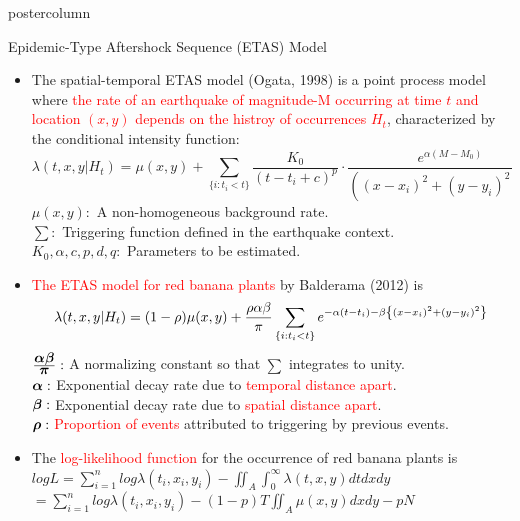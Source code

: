 \documentclass[final]{beamer}\usepackage[]{graphicx}\usepackage[]{color}
\newcommand{\bpi}{\mbox{\boldmath $\pi$} }
\newcommand{\balpha}{\mbox{\boldmath $\alpha$} }
\newcommand{\bbeta}{\mbox{\boldmath $\beta$} }
\newcommand{\brho}{\mbox{\boldmath $\rho$} }
\let\originalleft\left
\let\originalright\right
\renewcommand{\left}{\mathopen{}\mathclose\bgroup\originalleft}
\renewcommand{\right}{\aftergroup\egroup\originalright}
\newcommand{\red}{\textcolor{red}}
\begin{document}
{\begin{frame}
\begin{columns}
\begin{column}{.33\textwidth}
\begin{beamercolorbox}[center,wd=\textwidth]{postercolumn}
\begin{minipage}[T]{.97\textwidth}
{\begin{block}{Epidemic-Type Aftershock Sequence (ETAS) Model}
\begin{itemize}
	\item The spatial-temporal ETAS model (Ogata, 1998) is a point process model where \red{the rate of an earthquake of magnitude-M occurring at time $t$ and location $(x,y)$ depends on the histroy of occurrences $H_t$}, characterized by	the conditional intensity function:
	      $$\lambda(t,x,y|H_t)=\mu(x,y)+\sum \limits_{\{i:t_i<t\}}\frac{K_0}{(t-t_i+c)^p} \cdot  \frac{e^{\alpha(M-M_0)}}{((x-x_i)^2+(y-y_i)^2+d)^q}$$
	      $\mu(x, y):$ A non-homogeneous background rate.\\
	      $\sum:$ Triggering function defined in the earthquake context.\\
	      $K_0,\alpha, c, p, d, q:$ Parameters to be estimated.
	\vspace{0.5cm}
  \item \red{The ETAS model for red banana plants} by Balderama (2012) is
        $$\displaystyle{\lambda(t,x,y|H_t)=(1-\rho)\mu(x,y)+\frac{\rho\alpha\beta}{\pi}\sum \limits_{\left\{i:t_i<t\right\}}e^{-\alpha(t-t_i)-\beta\left\{(x-x_i)^2+(y-y_i)^2\right\}}}$$
        $\frac{\balpha\bbeta}{\bpi}:$ A normalizing constant so that $\sum$ integrates to unity.\\
        $\balpha:$ Exponential decay rate due to \red{temporal distance apart}.\\
        $\bbeta:$ Exponential decay rate due to \red{spatial distance apart}.\\
        $\brho:$ \red{Proportion of events} attributed to triggering by previous events.
  \vspace{0.4cm}
  \item The \red{log-likelihood function} for the occurrence of red banana plants is \\
   \hspace{1cm} $\displaystyle{logL=\sum \limits_{i=1}^{n}log\lambda(t_i,x_i,y_i)-\iint_A \int_0^\infty \lambda(t,x,y)dtdxdy}$  \\
   \hspace{3.1cm} $\displaystyle{=\sum \limits_{i=1}^{n}log\lambda(t_i,x_i,y_i)-(1-p)T\iint_A\mu(x,y)dxdy-pN}$
   
   
\end{itemize}
  


\end{block}
\vfill

}
\end{minipage}
\end{beamercolorbox}
\end{column}
\end{columns}
\end{frame}}
\end{document}
